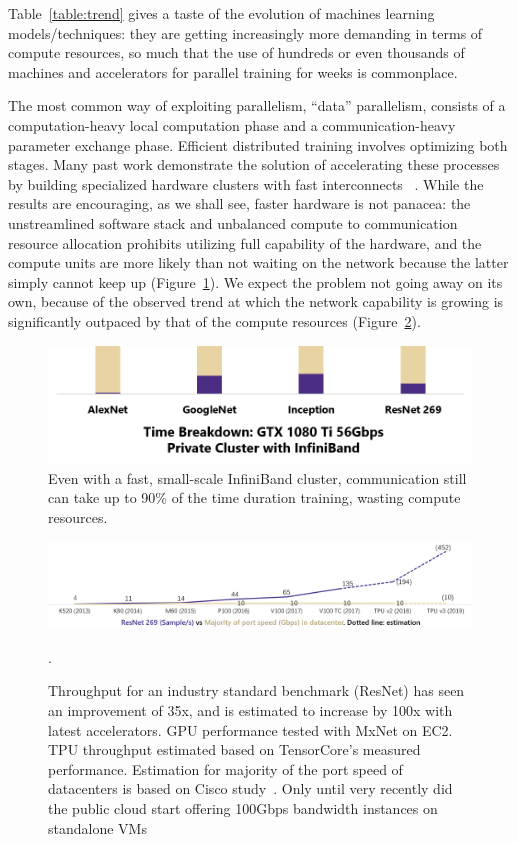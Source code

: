 Table~\ref{table:trend} gives a taste of the evolution of machines learning models/techniques: they are getting increasingly more demanding in terms of compute resources, so much that the use of hundreds or even thousands of machines and accelerators for parallel training for weeks is commonplace. 




The most common way of exploiting parallelism, ``data'' parallelism, consists of a computation-heavy local computation phase and a communication-heavy parameter exchange phase. Efficient distributed training involves optimizing both stages. Many past work demonstrate the solution of accelerating these processes by building specialized hardware clusters with fast interconnects ~\cite{DBLP:journals/corr/abs-1711-00489, You:2018:ITM:3225058.3225069, DBLP:journals/corr/abs-1711-04325,jia2018highly,DBLP:journals/corr/abs-1811-05233,sun2019optimizing, ImageNetIn1Hour, firecaffe, phubsocc}. While the results are encouraging, as we shall see, faster hardware is not panacea: the unstreamlined software stack and unbalanced compute to communication resource allocation prohibits utilizing full capability of the hardware, and the compute units are more likely than not waiting on the network because the latter simply cannot keep up (Figure~\ref{fig:clusterOverhead}). We expect the problem not going away on its own, because of the observed trend at which the network capability is growing is significantly outpaced by that of the compute resources (Figure~\ref{fig:accthroughput}).  


\begin{figure}
	\centering
	\includegraphics[width=.5\linewidth, trim=6 1 3 3,clip]{Figures/clusteroverhead.png}
	\caption{Even with a fast, small-scale InfiniBand cluster, communication still can take up to 90\% of the time duration training, wasting compute resources.}
	\label{fig:clusterOverhead}
\end{figure}

\begin{figure}
	\centering
	\includegraphics[width=\linewidth, trim=2 3 3 3,clip]{Figures/computevscomm.png}
	\caption{Throughput for an industry standard benchmark (ResNet) has seen an improvement of 35x, and is estimated to increase by 100x with latest accelerators. GPU performance tested with MxNet on EC2. TPU throughput estimated based on TensorCore's measured performance. Estimation for majority of the port speed of datacenters is based on Cisco study~\cite{CISCOMarket}. Only until very recently did the public cloud start offering 100Gbps bandwidth instances on standalone VMs~\cite{Introduc9:online, NewC5nIn6:online}}.
	\label{fig:accthroughput}
\end{figure}

